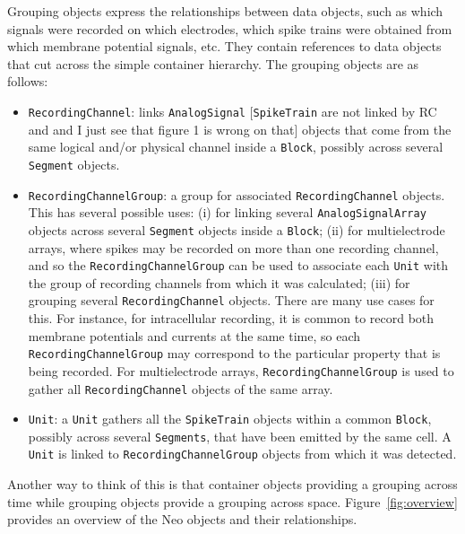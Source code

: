 \documentclass{frontiers}
\newcommand{\samuel}[1]{[\textcolor{RubineRed}{#1}]}
\begin{document}
Grouping objects express the relationships between data objects, such as which signals were recorded on which electrodes, which spike trains were obtained from which membrane potential signals, etc.
They contain references to data objects that cut across the simple container hierarchy.
The grouping objects are as follows:

\begin{itemize}
\item \lstinline`RecordingChannel`: links \lstinline`AnalogSignal` \samuel{\lstinline`SpikeTrain` are not linked by RC and and I just see that figure 1 is wrong on that} objects that come from the same logical and/or physical channel inside a \lstinline`Block`, possibly across several \lstinline`Segment` objects.
\item \lstinline`RecordingChannelGroup`: a group for associated \lstinline`RecordingChannel` objects. This has several possible uses: 
(i) for linking several \lstinline`AnalogSignalArray` objects across several \lstinline`Segment` objects inside a \lstinline`Block`;
(ii) for multielectrode arrays, where spikes may be recorded on more than one recording channel, and so the \lstinline`RecordingChannelGroup` can be used to associate each \lstinline`Unit` with the group of recording channels from which it was calculated;
(iii) for grouping several \lstinline`RecordingChannel` objects. There are many use cases for this. For instance, for intracellular recording, it is common to record both membrane potentials and currents at the same time, so each \lstinline`RecordingChannelGroup` may correspond to the particular property that is being recorded. For multielectrode arrays, \lstinline`RecordingChannelGroup` is used to gather all \lstinline`RecordingChannel` objects of the same array.
\item \lstinline`Unit`: a \lstinline`Unit` gathers all the \lstinline`SpikeTrain` objects within a common \lstinline`Block`, possibly across several \lstinline`Segments`, that have been emitted by the same cell. A \lstinline`Unit` is linked to \lstinline`RecordingChannelGroup` objects from which it was detected.
\end{itemize}

Another way to think of this is that container objects providing a grouping across time while grouping objects provide a grouping across space.
Figure~\ref{fig:overview} provides an overview of the Neo objects and their relationships.
\end{document}
